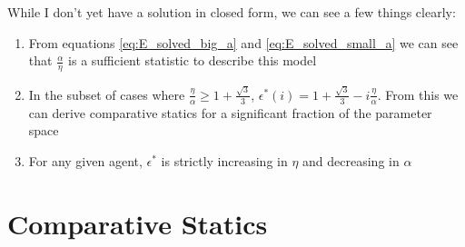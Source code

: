 \documentclass[WP]{AEA}
\begin{document}
While I don't yet have a solution in closed form, we can see a few things clearly:
\begin{enumerate}
	\item From equations \ref{eq:E_solved_big_a} and \ref{eq:E_solved_small_a} we can see that $\frac{\alpha}{\eta}$ is a sufficient statistic to describe this model
	\item  In the subset of cases where $ \frac{\eta}{\alpha} \geq 1+\frac{\sqrt{3}}{3}$, 
	$\epsilon^*(i) = 1+\frac{\sqrt{3}}{3} - i \frac{\eta}{\alpha}$. From this we can derive comparative statics for a significant fraction of the parameter space
	\item For any given agent, $\epsilon^* $ is strictly increasing in $\eta$ and decreasing in $\alpha$
\end{enumerate}



%



%
%
%

\section{Comparative Statics}
\end{document}
